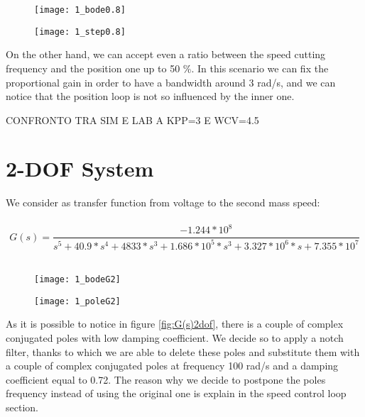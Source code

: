 \begin{figure*}[h]
	\centering
	\begin{subfigure}{0.45\columnwidth}
		\texttt{[image: 1\_bode0.8]}
	\end{subfigure}
	\begin{subfigure}{0.45\columnwidth}
		\texttt{[image: 1\_step0.8]}
	\end{subfigure}
	\caption{Position control loop with  $wc_{p} $=0.8 rad/s}
	\label{fig:Bode and Step P 0.8}
\end{figure*}

On the other hand, we can accept even a ratio between the speed cutting frequency and the position one up to 50 \%. In this scenario we can fix the proportional gain in order to have a bandwidth around 3 rad/s, and we can notice that the position loop is not so influenced by the inner one.

CONFRONTO TRA SIM E LAB A KPP=3 E WCV=4.5

\newpage
\section{2-DOF System}
We consider as transfer function from voltage to the second mass speed:\\
\\
\[	
G(s)=
\frac{-1.244*10^{8}}{s^5+40.9*s^{4}+4833*s^{3}+1.686*10^{5}*s^{3}+3.327*10^{6}*s+7.355*10^{7}}
\]
\\



\begin{figure*}[h]
	\centering
	\begin{subfigure}{0.4\columnwidth}
		\texttt{[image: 1\_bodeG2]}
	\end{subfigure}
	\begin{subfigure}{0.4\columnwidth}
		\texttt{[image: 1\_poleG2]}
	\end{subfigure}
	\caption{G(s)}
	\label{fig:G(s)2dof}
\end{figure*}

As it is possible to notice in figure \ref{fig:G(s)2dof}, there is a couple of complex conjugated poles with low damping coefficient. We decide so to apply a notch filter, thanks to which we are able to delete these poles and substitute them with a couple of complex conjugated poles at frequency 100 rad/s and a damping coefficient equal to 0.72. The reason why we decide to postpone the poles frequency instead of using the original one is explain in the speed control loop section.


